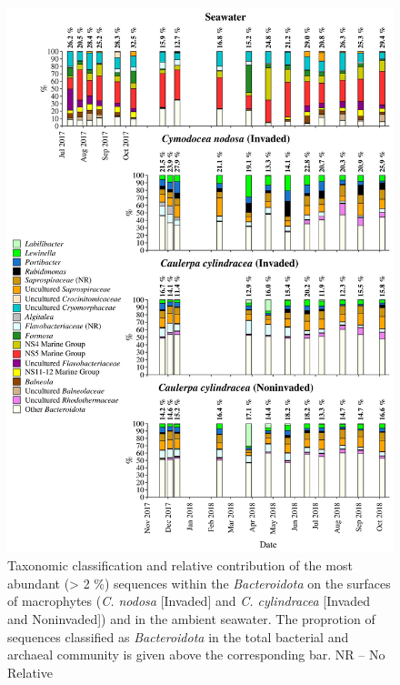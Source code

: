 \documentclass[12pt,]{article}
\begin{document}
\begin{figure}[H]

{\centering \includegraphics[width=0.85\linewidth]{../results/figures/bacteroidota_bar_plot} 

}

\caption{Taxonomic classification and relative contribution of the most abundant (> 2 \si{\percent}) sequences within the \textit{Bacteroidota} on the surfaces of macrophytes (\textit{C. nodosa} [Invaded] and \textit{C. cylindracea} [Invaded and Noninvaded]) and in the ambient seawater. The proprotion of sequences classified as \textit{Bacteroidota} in the total bacterial and archaeal community is given above the corresponding bar. NR -- No Relative\label{bactero}}\label{fig:unnamed-chunk-6}
\end{figure}
\end{document}

